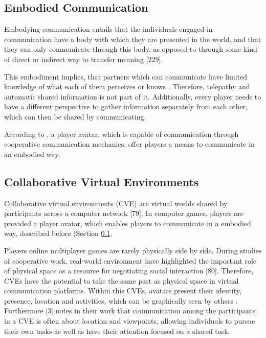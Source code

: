 \subsection{Embodied Communication}
\label{section:Embodied Communication}

Embodying communication entails that the individuals engaged in communication have a body with which they are presented in the world, and that they can only communicate through this body, as opposed to through some kind of direct or indirect way to transfer meaning \autocite{Galantucci2012TheHumans}[229].

This embodiment implies, that partners which can communicate have limited knowledge of what each of them perceives or knows \autocite{Galantucci2012TheHumans}. Therefore, telepathy and automatic shared information is not part of it. Additionally, every player needs to have a different perspective to gather information separately from each other, which can then be shared by communicating. 

According to \textcite{Vaddi2016Investigating2}, a player avatar, which is capable of communication through cooperative communication mechanics, offer players a means to communicate in an embodied way.


\subsection{Collaborative Virtual Environments}
\label{section:Collaborative Virtual Environments}

Collaborative virtual environments (CVE) are virtual worlds shared by participants across a computer network \autocite{Benford2001CollaborativeEnvironments}[79]. In computer games, players are provided a player avatar, which enables players to communicate in a embodied way, described before (Section \ref{section:Embodied Communication}. 

Players online multiplayer games are rarely physically side by side. During studies of cooperative work, real-world environment have highlighted the important role of physical space as a resource for negotiating social interaction \autocite{Benford2001CollaborativeEnvironments}[80]. Therefore, CVEs have the potential to take the same part as physical space in virtual communication platforms.
Within this CVEs, avatars present their identity, presence, location and activities, which can be graphically seen by others \autocite{Benford2001CollaborativeEnvironments}.
Furthermore \textcite{Maher2011DesignersEnvironments}[3] notes in their work that communication among the participants in a CVE is often about location and viewpoints, allowing individuals to pursue their own tasks as well as have their attention focused on a shared task.